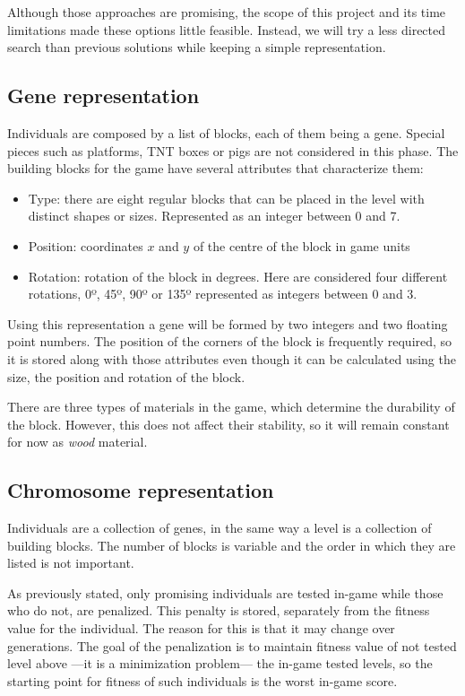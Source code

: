 Although those approaches are promising, the scope of this project and its time limitations made these options little feasible. Instead, we will try a less directed search than previous solutions while keeping a simple representation.
\subsection{Gene representation}
Individuals are composed by a list of blocks, each of them being a gene. Special pieces such as platforms, TNT boxes or pigs are not considered in this phase. The building blocks for the game have several attributes that characterize them: 

\begin{itemize}
	\item Type: there are eight regular blocks that can be placed in the level with distinct shapes or sizes. Represented as an integer between $0$ and 7.
	\item Position: coordinates $x$ and $y$ of the centre of the block in game units 
	\item Rotation: rotation of the block in degrees. Here are considered four different rotations, 0º, 45º, 90º or 135º represented as integers between $0$ and 3.
\end{itemize}

Using this representation a gene will be formed by two integers and two floating point numbers.
The position of the corners of the block is frequently required, so it is stored along with those attributes even though it can be calculated using the size, the position and rotation of the block. 

There are three types of materials in the game, which determine the durability of the block. However, this does not affect their stability, so it will remain constant for now as \textit{wood} material.


\subsection{Chromosome representation}

Individuals are a collection of genes, in the same way a level is a collection of building blocks. The number of blocks is variable and the order in which they are listed is not important. 

As previously stated, only promising individuals are tested in-game while those who do not,  are penalized. This penalty is stored, separately from the fitness value for the individual. The reason for this is that it may change over generations. The goal of the penalization is to maintain fitness value of not tested level above ---it is a minimization problem--- the in-game tested levels, so the starting point for fitness of such individuals is the worst in-game score.

